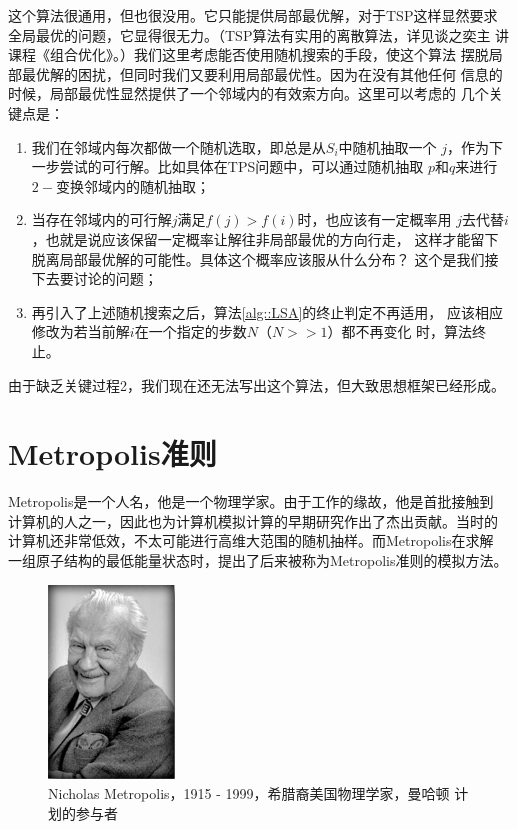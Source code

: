 这个算法很通用，但也很没用。它只能提供局部最优解，对于TSP这样显然要求
全局最优的问题，它显得很无力。（TSP算法有实用的离散算法，详见谈之奕主
  讲课程《组合优化》。）我们这里考虑能否使用随机搜索的手段，使这个算法
摆脱局部最优解的困扰，但同时我们又要利用局部最优性。因为在没有其他任何
信息的时候，局部最优性显然提供了一个邻域内的有效索方向。这里可以考虑的
几个关键点是：
\begin{enumerate}
  \item 我们在邻域内每次都做一个随机选取，即总是从$S_i$中随机抽取一个
    $j$，作为下一步尝试的可行解。比如具体在TPS问题中，可以通过随机抽取
    $p$和$q$来进行$2-$变换邻域内的随机抽取；
  \item 当存在邻域内的可行解$j$满足$f(j) > f(i)$时，也应该有一定概率用
    $j$去代替$i$，也就是说应该保留一定概率让解往非局部最优的方向行走，
    这样才能留下脱离局部最优解的可能性。具体这个概率应该服从什么分布？
    这个是我们接下去要讨论的问题；
  \item 再引入了上述随机搜索之后，算法\ref{alg::LSA}的终止判定不再适用，
    应该相应修改为若当前解$i$在一个指定的步数$N$（$N >> 1$）都不再变化
    时，算法终止。
\end{enumerate}

由于缺乏关键过程2，我们现在还无法写出这个算法，但大致思想框架已经形成。

\section{Metropolis准则}

Metropolis是一个人名，他是一个物理学家。由于工作的缘故，他是首批接触到
计算机的人之一，因此也为计算机模拟计算的早期研究作出了杰出贡献。当时的
计算机还非常低效，不太可能进行高维大范围的随机抽样。而Metropolis在求解
一组原子结构的最低能量状态时，提出了后来被称为Metropolis准则的模拟方法。

\begin{figure}[!ht]
\centering
\includegraphics[width=0.3\textwidth]{images/Nicholas.PNG}
\caption{Nicholas Metropolis，1915 - 1999，希腊裔美国物理学家，曼哈顿
  计划的参与者}
\label{fig::game}
\end{figure}

